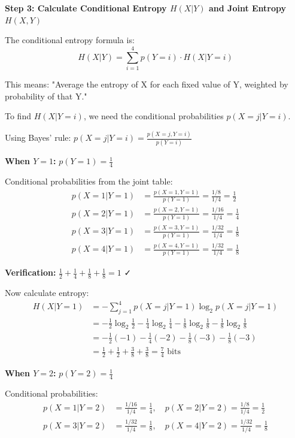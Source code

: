 \documentclass[11pt,a4paper]{book}
\newenvironment{formulabox}[1][Formula]{
    \begin{tcolorbox}[
        enhanced,
        breakable,
        colback=softcoral!10,
        colframe=softcoral!200,
        title=#1,
        fonttitle=\bfseries,
        coltitle=white,
        sharp corners,
        boxrule=1pt,
        left=8pt,
        right=8pt,
        top=6pt,
        bottom=6pt
    ]
}{
    \end{tcolorbox}
}
\newcounter{qna}[chapter]
\renewcommand{\theqna}{\thechapter.\arabic{qna}}
\newenvironment{questionanswerbox}{
    \refstepcounter{qna}%
    \begin{tcolorbox}[
        enhanced,
        breakable,
        colback=softlavender!10,
        colframe=softlavender!200,
        title={Example~\theqna}, %
        fonttitle=\bfseries,
        coltitle=white,
        colbacktitle=softlavender!200,
        sharp corners,
        boxrule=1pt,
        left=8pt,
        right=8pt,
        top=6pt,
        bottom=6pt
    ]
}{
    \end{tcolorbox}
}
\begin{document}
\begin{questionanswerbox}
    \textbf{Step 3: Calculate Conditional Entropy \(H(X|Y)\) and Joint Entropy \(H(X,Y)\)}
    
    The conditional entropy formula is:
    \[
    H(X|Y) = \sum_{i=1}^{4} p(Y=i) \cdot H(X|Y=i)
    \]
    
    This means: "Average the entropy of X for each fixed value of Y, weighted by probability of that Y."

    \begin{formulabox}[Bayes' rule]
        To find \(H(X|Y=i)\), we need the conditional probabilities \(p(X=j|Y=i)\).
    
    Using Bayes' rule: \(p(X=j|Y=i) = \frac{p(X=j, Y=i)}{p(Y=i)}\)
    \end{formulabox}
    
    \hrulefill
    
    \textbf{When \(Y=1\):} \(p(Y=1) = \frac{1}{4}\)
    
    Conditional probabilities from the joint table:
    \begin{align*}
    p(X=1|Y=1) &= \frac{p(X=1,Y=1)}{p(Y=1)} = \frac{1/8}{1/4} = \frac{1}{2} \\
    p(X=2|Y=1) &= \frac{p(X=2,Y=1)}{p(Y=1)} = \frac{1/16}{1/4} = \frac{1}{4} \\
    p(X=3|Y=1) &= \frac{p(X=3,Y=1)}{p(Y=1)} = \frac{1/32}{1/4} = \frac{1}{8} \\
    p(X=4|Y=1) &= \frac{p(X=4,Y=1)}{p(Y=1)} = \frac{1/32}{1/4} = \frac{1}{8}
    \end{align*}
    
    \textbf{Verification:} \(\frac{1}{2} + \frac{1}{4} + \frac{1}{8} + \frac{1}{8} = 1\) ✓
    
    Now calculate entropy:
    \begin{align*}
    H(X|Y=1) &= -\sum_{j=1}^{4} p(X=j|Y=1) \log_2 p(X=j|Y=1) \\
    &= -\frac{1}{2}\log_2\frac{1}{2} - \frac{1}{4}\log_2\frac{1}{4} - \frac{1}{8}\log_2\frac{1}{8} - \frac{1}{8}\log_2\frac{1}{8} \\
    &= -\frac{1}{2}(-1) - \frac{1}{4}(-2) - \frac{1}{8}(-3) - \frac{1}{8}(-3) \\
    &= \frac{1}{2} + \frac{1}{2} + \frac{3}{8} + \frac{3}{8} = \frac{7}{4} \text{ bits}
    \end{align*}
    
    \hrulefill
    
    \textbf{When \(Y=2\):} \(p(Y=2) = \frac{1}{4}\)
    
    Conditional probabilities:
    \begin{align*}
    p(X=1|Y=2) &= \frac{1/16}{1/4} = \frac{1}{4}, \quad
    p(X=2|Y=2) = \frac{1/8}{1/4} = \frac{1}{2} \\
    p(X=3|Y=2) &= \frac{1/32}{1/4} = \frac{1}{8}, \quad
    p(X=4|Y=2) = \frac{1/32}{1/4} = \frac{1}{8}
    \end{align*}
    

\end{questionanswerbox}
\end{document}
